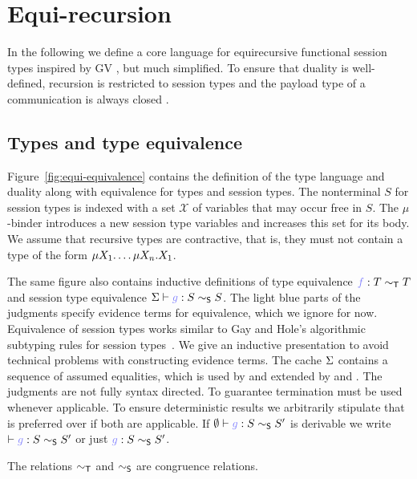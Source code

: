 \section{Equi-recursion}
\label{sec:equi-recursion}


In the following we define a core language for equirecursive
functional session types inspired by GV
\cite{DBLP:journals/jfp/GayV10}, but much simplified. To ensure that
duality is well-defined,
recursion is restricted to session types and the payload type of a
communication is always closed \cite{DBLP:journals/corr/abs-2004-01322}.

\subsection{Types and type equivalence}
\label{sec:types}


Figure~\ref{fig:equi-equivalence} contains the definition of the type language
and duality along with equivalence for types and session types. The nonterminal
$S$ for session types is indexed with a set $\mathcal X$ of variables that may
occur free in $S$. The $\mu$-binder introduces a new session type
variables and increases this set for its body. We assume
that recursive types are contractive, that is, they must not contain a type of
the form $\TRec[X_1]\dots\TRec[X_n]X_1$.

The same figure also contains inductive definitions of type equivalence $\convexpr{f} : T \eqt
T$ and session type equivalence $\eqsctxt \vdash \convexpr{g} : S \eqs S$. The light
blue parts of the judgments specify evidence terms for equivalence, which we ignore for now.
Equivalence of session
types works similar to Gay and Hole's algorithmic subtyping rules for session
types~\cite{DBLP:journals/acta/GayH05}. We give an inductive
presentation to avoid technical problems with constructing evidence
terms. The cache $\eqsctxt$ contains a sequence of
assumed equalities, which is used by \EqAssump{} and extended by \EqUnrollL{}
and \EqUnrollR{}. The judgments are not fully syntax directed. To
guarantee termination \EqAssump{} must be used whenever applicable. To ensure
deterministic results we arbitrarily stipulate that \EqUnrollL{} is
preferred over \EqUnrollR{} if both are applicable. If 
$\eqsrel[\emptyset]{g}{S}{S'}$ is derivable we write $\eqsrel[]{g}{S}{S'}$ or
just $\convexpr{g} : S \eqs S'$. 

\begin{lemma}\label{lemma:congruence}
 The relations $\eqt$ and $\eqs$ are congruence relations.
\end{lemma}

